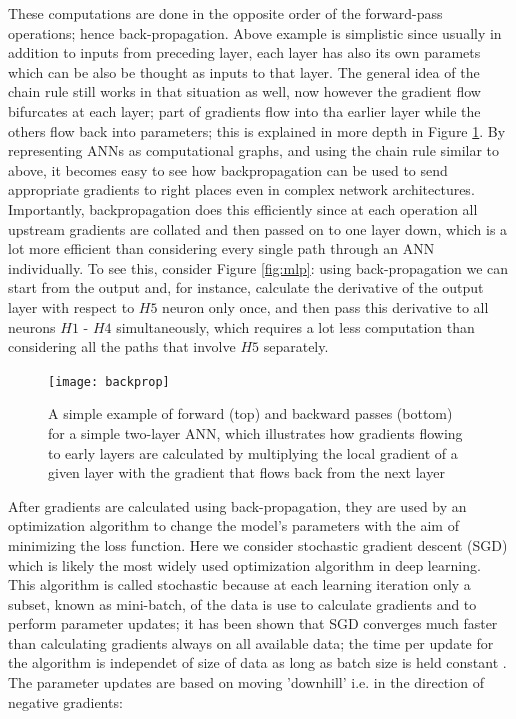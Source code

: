 \documentclass[12pt]{report}
\begin{document}
These computations are done in the opposite order of the forward-pass operations; hence back-propagation. Above example is simplistic since usually in addition to inputs from preceding layer, each layer has also its own paramets which can be also be thought as inputs to that layer. The general idea of the chain rule still works in that situation as well, now however the gradient flow bifurcates at each layer; part of gradients flow into tha earlier layer while the others flow back into parameters; this is explained in more depth in Figure \ref{fig:backprop}. By representing ANNs as computational graphs, and using the chain rule similar to above, it becomes easy to see how backpropagation can be used to send appropriate gradients to right places even in complex network architectures. Importantly, backpropagation does this efficiently since at each operation all upstream gradients are collated and then passed on to one layer down, which is a lot more efficient than considering every single path through an ANN individually. To see this, consider Figure \ref{fig:mlp}: using back-propagation we can start from the output and, for instance, calculate the derivative of the output layer with respect to $H5$ neuron only once, and then pass this derivative to all neurons $H1$ - $H4$ simultaneously, which requires a lot less computation than considering all the paths that involve $H5$ separately. 

\begin{figure}
  \centering
	\texttt{[image: backprop]}
	\caption{A simple example of forward (top) and backward passes (bottom) for a simple two-layer ANN, which illustrates how gradients flowing to early layers are calculated by multiplying the local gradient of a given layer with the gradient that flows back from the next layer}
	\label{fig:backprop}
\end{figure}

After gradients are calculated using back-propagation, they are used by an optimization algorithm to change the model's parameters with the aim of minimizing the loss function. Here we consider stochastic gradient descent (SGD) \cite{Robbins1951} which is likely the most widely used optimization algorithm in deep learning. This algorithm is called stochastic because at each learning iteration only a subset, known as mini-batch, of the data is use to calculate gradients and to perform parameter updates; it has been shown that SGD converges much faster than calculating gradients always on all available data; the time per update for the algorithm is independet of size of data as long as batch size is held constant \cite{Goodfellow2016}. The parameter updates are based on moving 'downhill' i.e. in the direction of negative gradients:
\end{document}
